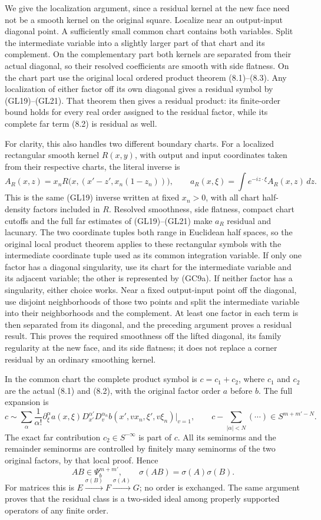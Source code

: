 \documentclass[
  11pt,
]{article}
\begin{document}
We give the localization argument, since a residual kernel at the new
face need not be a smooth kernel on the original square. Localize near
an output-input diagonal point. A sufficiently small common chart
contains both variables. Split the intermediate variable into a slightly
larger part of that chart and its complement. On the complementary part
both kernels are separated from their actual diagonal, so their resolved
coefficients are smooth with side flatness. On the chart part use the
original local ordered product theorem (8.1)--(8.3). Any localization of
either factor off its own diagonal gives a residual symbol by
(GL19)--(GL21). That theorem then gives a residual product: its
finite-order bound holds for every real order assigned to the residual
factor, while its complete far term (8.2) is residual as well.

For clarity, this also handles two different boundary charts. For a
localized rectangular smooth kernel \(R(x,y)\), with output and input
coordinates taken from their respective charts, the literal inverse is
\[
 A_R(x,z)=x_nR\bigl(x,(x'-z',x_n(1-z_n))\bigr),
 \qquad a_R(x,\xi)=\int e^{-iz\cdot\xi}A_R(x,z)\,dz.
 \tag{GC9a}
\] This is the same (GL19) inverse written at fixed \(x_n>0\), with all
chart half-density factors included in \(R\). Resolved smoothness, side
flatness, compact chart cutoffs and the full far estimates of
(GL19)--(GL21) make \(a_R\) residual and lacunary. The two coordinate
tuples both range in Euclidean half spaces, so the original local
product theorem applies to these rectangular symbols with the
intermediate coordinate tuple used as its common integration variable.
If only one factor has a diagonal singularity, use its chart for the
intermediate variable and its adjacent variable; the other is
represented by (GC9a). If neither factor has a singularity, either
choice works. Near a fixed output-input point off the diagonal, use
disjoint neighborhoods of those two points and split the intermediate
variable into their neighborhoods and the complement. At least one
factor in each term is then separated from its diagonal, and the
preceding argument proves a residual result. This proves the required
smoothness off the lifted diagonal, its family regularity at the new
face, and its side flatness; it does not replace a corner residual by an
ordinary smoothing kernel.

In the common chart the complete product symbol is \(c=c_1+c_2\), where
\(c_1\) and \(c_2\) are the actual (8.1) and (8.2), with the original
factor order \(a\) before \(b\). The full expansion is \[
 c\sim\sum_\alpha\frac1{\alpha!}\partial_\xi^\alpha a(x,\xi)
 D_{x'}^{\alpha'}D_v^{\alpha_n}
 b(x',v x_n,\xi',v\xi_n)\big|_{v=1},
 \qquad
 c-\sum_{|\alpha|<N}(\cdots)\in S^{m+m'-N}.
 \tag{GC9}
\] The exact far contribution \(c_2\in S^{-\infty}\) is part of \(c\).
All its seminorms and the remainder seminorms are controlled by finitely
many seminorms of the two original factors, by that local proof. Hence
\[
 AB\in\Psi_b^{m+m'},\qquad
 \sigma(AB)=\sigma(A)\sigma(B).
 \tag{GC10}
\] For matrices this is \(E\xrightarrow{\sigma(B)}F
\xrightarrow{\sigma(A)}G\); no order is exchanged. The same argument
proves that the residual class is a two-sided ideal among properly
supported operators of any finite order.
\end{document}
